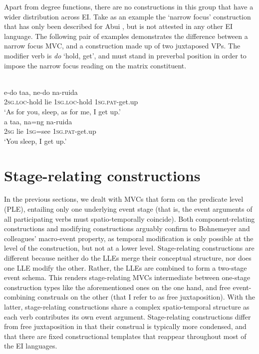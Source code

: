 Apart from degree functions, there are no constructions in this group that have a wider distribution across EI. Take as an example the `narrow focus' construction that has only been described for Abui \citep[385f.]{kratochvil2007grammar}, but is not attested in any other EI language. The following pair of examples demonstrates the difference between a narrow focus MVC, and a construction made up of two juxtaposed VPs. The modifier verb is \textit{do} `hold, get', and must stand in preverbal position in order to impose the narrow focus reading on the matrix constituent.

\ea \label{Abui_99}
\\
\ea
\gll e-do taa, ne-do na-ruida \\
2\textsc{sg}.\textsc{loc}-hold lie 1\textsc{sg}.\textsc{loc}-hold 1\textsc{sg}.\textsc{pat}-get.up \\
\glft `As for you, sleep, as for me, I get up.’ \\ 
\ex
\gll a taa, na=ng na-ruida \\ 
2\textsc{sg} lie 1\textsc{sg}=see 1\textsc{sg}.\textsc{pat}-get.up \\
\glft `You sleep, I get up.’\\ 
\z
\z

\section{Stage-relating constructions}\label{sec:stage-relating}

In the previous sections, we dealt with MVCs that form on the predicate level (PLE), entailing only one underlying event stage (that is, the event arguments of all participating verbs must spatio-temporally coincide). Both component-relating constructions and modifying constructions arguably confirm to Bohnemeyer and colleagues' macro-event property, as temporal modification is only possible at the level of the construction, but not at a lower level. Stage-relating constructions are different because neither do the LLEs merge their conceptual structure, nor does one LLE modify the other. Rather, the LLEs are combined to form a two-stage event schema. This renders stage-relating MVCs intermediate between one-stage construction types like the aforementioned ones on the one hand, and free event-combining construals on the other (that I refer to as free juxtaposition). With the latter, stage-relating constructions share a complex spatio-temporal structure as each verb contributes its own event argument. Stage-relating constructions differ from free juxtaposition in that their construal is typically more condensed, and that there are fixed constructional templates that reappear throughout most of the EI languages.

